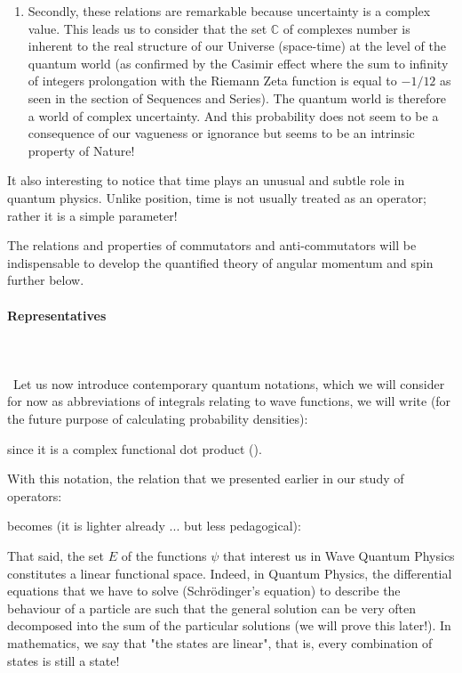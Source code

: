 \begin{enumerate}
		\item Secondly, these relations are remarkable because uncertainty is a complex value. This leads us to consider that the set $\mathbb{C}$ of complexes number is inherent to the real structure of our Universe (space-time) at the level of the quantum world (as confirmed by the Casimir effect where the sum to infinity of integers prolongation with the Riemann Zeta function is equal to $-1/12$ as seen in the section of Sequences and Series). The quantum world is therefore a world of complex uncertainty. And this probability does not seem to be a consequence of our vagueness or ignorance but seems to be an intrinsic property of Nature!
	\end{enumerate}
	
	It also interesting to notice that time plays an unusual and subtle role in quantum physics. Unlike position, time is not usually treated as an operator; rather it is a simple parameter!
	\begin{tcolorbox}[title=Remark,colframe=black,arc=10pt]
	The relations and properties of commutators and anti-commutators will be indispensable to develop the quantified theory of angular momentum and spin further below.
	\end{tcolorbox}
	
	\paragraph{Representatives}\mbox{}\\\\\
	Let us now introduce contemporary quantum notations, which we will consider for now as abbreviations of integrals relating to wave functions, we will write (for the future purpose of calculating probability densities):
	
	since it is a complex functional dot product ().

	With this notation, the relation that we presented earlier in our study of operators:
	
	becomes (it is lighter already ... but less pedagogical):
	
	That said, the set $E$ of the functions $\psi$ that interest us in Wave Quantum Physics constitutes a linear functional space. Indeed, in Quantum Physics, the differential equations that we have to solve (Schrödinger's equation) to describe the behaviour of a particle are such that the general solution can be very often decomposed into the sum of the particular solutions (we will prove this later!). In mathematics, we say that "the states are linear", that is, every combination of states is still a state!
	
